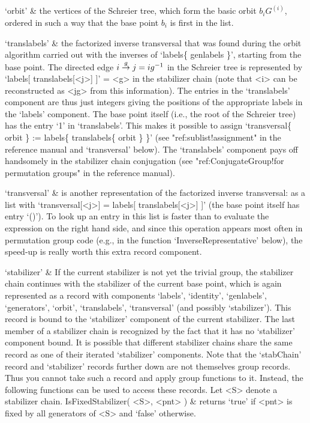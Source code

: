 `orbit' &
        the vertices of  the Schreier tree,  which  form the basic  orbit
        $b_iG^{(i)}$, ordered in such a way that the  base point $b_i$ is
        first in the list.

`translabels' &
        the factorized inverse   transversal  that was  found during  the
        orbit  algorithm  carried out   with the   inverses of  `labels\{
        genlabels \}', starting from the base point. The directed edge $i
        \labelto g j  = ig^{-1}$ in  the Schreier tree  is represented by
        `labels[ translabels[<j>] ]' = <g> in  the stabilizer chain (note
        that <i> can be reconstructed as <jg> from this information). The
        entries in the `translabels'   component are thus   just integers
        giving the  positions of the appropriate   labels in the `labels'
        component. The base point itself (i.e.,  the root of the Schreier
        tree) has the entry `1' in  `translabels'. This makes it possible
        to assign `transversal\{ orbit \} := labels\{ translabels\{ orbit
        \} \}' (see  "ref:sublist!assignment" in the reference manual and
        `transversal'  below).   The `translabels'   component   pays off
        handsomely   in    the   stabilizer    chain   conjugation   (see
        "ref:ConjugateGroup!for permutation      groups" in the reference
        manual).

`transversal' &
        is another  representation of the factorized inverse transversal:
        as a list   with `transversal[<j>] =  labels[ translabels[<j>] ]'
        (the base point  itself has entry `()').  To look up  an entry in
        this list is faster than to evaluate  the expression on the right
        hand side,  and   since this operation   appears  most  often  in
        permutation   group     code    (e.g.,    in      the    function
        `InverseRepresentative' below), the speed-up is really worth this
        extra record component.

`stabilizer' &
        If  the  current stabilizer is  not   yet the trivial  group, the
        stabilizer chain continues with   the stabilizer of  the  current
        base  point,  which is    again  represented as  a   record  with
        components `labels',    `identity',    `genlabels', `generators',
        `orbit',     `translabels',  `transversal'     (and      possibly
        `stabilizer'). This record is bound to the `stabilizer' component
        of the current stabilizer. The last member  of a stabilizer chain
        is recognized  by the fact that  it has no `stabilizer' component
        bound.
\enditems
It is possible that different stabilizer  chains share the same record as
one of their iterated `stabilizer' components.  Note that the `stabChain'
record and `stabilizer'  records further down   are not themselves  group
records. Thus you cannot take such a record and  apply group functions to
it. Instead, the following functions can be used to access these records.
Let <S> denote a stabilizer chain.
\beginitems
\function IsFixedStabilizer( <S>, <pnt> ) &
        returns `true'  if <pnt> is fixed by   all generators of  <S> and
        `false' otherwise.

